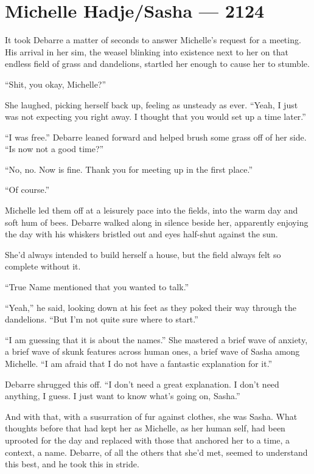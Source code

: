 \hypertarget{michelle-hadjesasha-2124}{%
\chapter{Michelle Hadje/Sasha — 2124}\label{michelle-hadjesasha-2124}}

It took Debarre a matter of seconds to answer Michelle's request for a meeting. His arrival in her sim, the weasel blinking into existence next to her on that endless field of grass and dandelions, startled her enough to cause her to stumble.

``Shit, you okay, Michelle?''

She laughed, picking herself back up, feeling as unsteady as ever. ``Yeah, I just was not expecting you right away. I thought that you would set up a time later.''

``I was free.'' Debarre leaned forward and helped brush some grass off of her side. ``Is now not a good time?''

``No, no. Now is fine. Thank you for meeting up in the first place.''

``Of course.''

Michelle led them off at a leisurely pace into the fields, into the warm day and soft hum of bees. Debarre walked along in silence beside her, apparently enjoying the day with his whiskers bristled out and eyes half-shut against the sun.

She'd always intended to build herself a house, but the field always felt so complete without it.

``True Name mentioned that you wanted to talk.''

``Yeah,'' he said, looking down at his feet as they poked their way through the dandelions. ``But I'm not quite sure where to start.''

``I am guessing that it is about the names.'' She mastered a brief wave of anxiety, a brief wave of skunk features across human ones, a brief wave of Sasha among Michelle. ``I am afraid that I do not have a fantastic explanation for it.''

Debarre shrugged this off. ``I don't need a great explanation. I don't need anything, I guess. I just want to know what's going on, Sasha.''

And with that, with a susurration of fur against clothes, she was Sasha. What thoughts before that had kept her as Michelle, as her human self, had been uprooted for the day and replaced with those that anchored her to a time, a context, a name. Debarre, of all the others that she'd met, seemed to understand this best, and he took this in stride.

